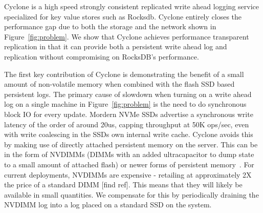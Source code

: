 \documentclass[pageno]{jpaper}
\begin{document}
Cyclone is a high speed strongly consistent replicated write ahead logging
service specialized for key value stores such as Rocksdb. Cyclone entirely
closes the performance gap due to both the storage and the network shown in
Figure~\ref{fig:problem}. We show that Cyclone achieves performance transparent
replication in that it can provide both a persistent write ahead log and
replication without compromising on RocksDB's performance.

The first key contribution of Cyclone is demonstrating the benefit of a small
amount of non-volatile memory when combined with the flash SSD based persistent
logs.  The primary cause of slowdown when turning on a write ahead log on a
single machine in Figure~\ref{fig:problem} is the need to do synchronous block
IO for every update. Mordern NVMe SSDs advertise a synchronous write latency of
the order of around 20us, capping throughput at 50K ops/sec, even with write coalescing 
in the SSDs own internal write cache. Cyclone avoids this by making use of directly attached persistent
memory on the server. This can be in the form of NVDIMMs (DIMMs with an added
ultracapacitor to dump state to a small amount of attached flash) or newer forms
of persistent memory~\cite{pmfs}. For current deployments, NVDIMMs are expensive
- retailing at approximately 2X the price of a standard DIMM [find ref]. This
means that they will likely be available in small quantities. We compensate for
this by periodically draining the NVDIMM log into a log placed on a standard SSD
on the system.
\end{document}

